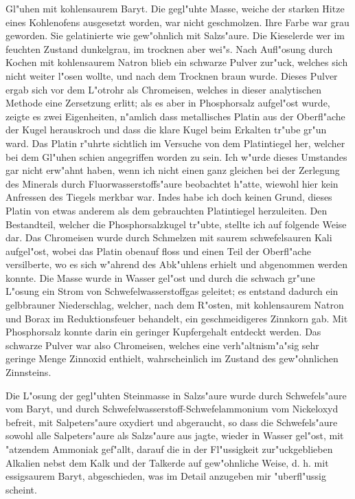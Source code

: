 \documentclass[a4paper, 11pt, oneside]{article}
\begin{document}
Gl"uhen mit kohlensaurem Baryt. Die gegl"uhte Masse, weiche der starken Hitze eines Kohlenofens ausgesetzt worden, war nicht geschmolzen. Ihre Farbe war grau geworden. Sie gelatinierte wie gew"ohnlich mit Salzs"aure. Die Kieselerde wer im feuchten Zustand dunkelgrau, im trocknen aber wei"s. Nach Aufl"osung durch Kochen mit kohlensaurem Natron blieb ein schwarze Pulver zur"uck, welches sich nicht weiter l"osen wollte, und nach dem Trocknen braun wurde. Dieses Pulver ergab sich vor dem L"otrohr als Chromeisen, welches in dieser analytischen Methode eine Zersetzung erlitt; als es aber in Phosphorsalz aufgel"ost wurde, zeigte es zwei Eigenheiten, n"amlich dass metallisches Platin aus der Oberfl"ache der Kugel herauskroch und dass die klare Kugel beim Erkalten tr"ube gr"un ward. Das Platin r"uhrte sichtlich im Versuche von dem Platintiegel her, welcher bei dem Gl"uhen schien angegriffen worden zu sein. Ich w"urde dieses Umstandes gar nicht erw"ahnt haben, wenn ich nicht einen ganz gleichen bei der Zerlegung des Minerals durch Fluorwasserstoffs"aure beobachtet h"atte, wiewohl hier kein Anfressen des Tiegels merkbar war. Indes habe ich doch keinen Grund, dieses Platin von etwas anderem als dem gebrauchten Platintiegel herzuleiten. Den Bestandteil, welcher die Phosphorsalzkugel tr"ubte, stellte ich auf folgende Weise dar. Das Chromeisen wurde durch Schmelzen mit saurem schwefelsauren Kali aufgel"ost, wobei das Platin obenauf floss und einen Teil der Oberfl"ache versilberte, wo es sich w"ahrend des Abk"uhlens erhielt und abgenommen werden konnte. Die Masse wurde in Wasser gel"ost und durch die schwach gr"une L"osung ein Strom von Schwefelwasserstoffgas geleitet; es entstand dadurch ein gelbbrauner Niederschlag, welcher, nach dem R"osten, mit kohlensaurem Natron und Borax im Reduktionsfeuer behandelt, ein geschmeidigeres Zinnkorn gab. Mit Phosphorsalz konnte darin ein geringer Kupfergehalt entdeckt werden. Das schwarze Pulver war also Chromeisen, welches eine verh"altnism"a"sig sehr geringe Menge Zinnoxid enthielt, wahrscheinlich im Zustand des gew"ohnlichen Zinnsteins.

Die L"osung der gegl"uhten Steinmasse in Salzs"aure wurde durch Schwefels"aure vom Baryt, und durch Schwefelwasserstoff-Schwefelammonium vom Nickeloxyd befreit, mit Salpeters"aure oxydiert und abgeraucht, so dass die Schwefels"aure sowohl alle Salpeters"aure als Salzs"aure aus jagte, wieder in Wasser gel"ost, mit "atzendem Ammoniak gef"allt, darauf die in der Fl"ussigkeit zur"uckgeblieben Alkalien nebst dem Kalk und der Talkerde auf gew"ohnliche Weise, d. h. mit essigsaurem Baryt, abgeschieden, was im Detail anzugeben mir "uberfl"ussig scheint.
\end{document}
